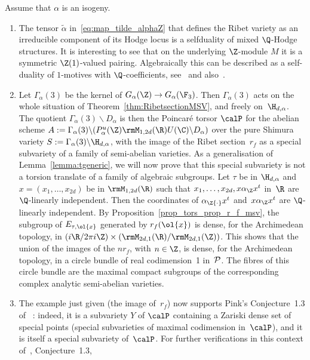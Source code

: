 \begin{Remark}\label{rem_r_f_msv}
Assume that $\alpha$ is an isogeny.
\begin{enumerate}
\item The tensor $\widetilde{\alpha}$ in~\eqref{eq:map_tilde_alphaZ}
that defines the Ribet variety as an irreducible component of its
Hodge locus is a selfduality of mixed $\Q$-Hodge structures. It is
interesting to see that on the underlying $\Z$-module $M$ it is a
symmetric $\Z(1)$-valued pairing. Algebraically this can be
described as a self-duality of $1$-motives with $\Q$-coefficients,
see~\cite{Ribet} and also~\cite{Bertrand13a}.
\item\label{rem_r_f_msv_item_2} Let $\Gamma_\alpha(3)$ be the kernel
of $G_\alpha(\Z)\to G_\alpha(\F_3)$. Then $\Gamma_\alpha(3)$ acts on
the whole situation of Theorem~\ref{thm:RibetsectionMSV}, and freely
on~$\H_{d,\alpha}$. The quotient $\Gamma_\alpha(3) \backslash
D_\alpha$ is then the Poincaré torsor $\calP$ for the abelian
scheme $A:=\Gamma_\alpha(3)\backslash
(P_\alpha^u(\Z)\rmM_{1,2d}(\R)U(\C)\backslash D_\alpha)$ over the
pure Shimura variety $S:=\Gamma_{\alpha}(3)\backslash
\H_{d,\alpha}$, with the image of the Ribet section~$r_f$ as a
special subvariety of a family of semi-abelian varieties. As a
generalisation of Lemma~\ref{lemma:tgeneric}, we will now prove that
this special subvariety is not a torsion translate of a family of
algebraic subgroups. Let $\tau$ be in $\H_{d,\alpha}$ and
$x=(x_1,\ldots,x_{2d})$ be in $\rmM_{1,2d}(\R)$ such that
$x_1,\ldots,x_{2d}, x\alpha_\Z x^t$ in~$\R$ are $\Q$-linearly
independent. Then the coordinates of $\alpha_\Z{\cdot}x^t$ and~$x\alpha_\Z x^t$ are $\Q$-linearly independent. By
Proposition~\ref{prop_tors_prop_r_f_msv}, the subgroup of
$E_{\tau,\ol{x}}$ generated by $r_f(\ol{x})$ is dense, for the
Archimedean topology, in $(i\R/2\pi
i\Z)\times(\rmM_{2d,1}(\R)/\rmM_{2d,1}(\Z))$. This shows that the
union of the images of the $nr_f$, with $n\in\nobreak\Z$, is dense, for the
Archimedean topology, in a circle bundle of real codimension~1
in~$\cal{P}$. The fibres of this circle bundle are the maximal
compact subgroups of the corresponding complex analytic semi-abelian
varieties.
\item The example just given (the image of~$r_f$) now supports Pink's
Conjecture~1.3 of ~\cite{Pink2}: indeed, it is a subvariety $Y$ of
$\calP$ containing a Zariski dense set of special points
(\ie special subvarieties of maximal codimension in~$\calP$), and
it is itself a special subvariety of~$\calP$. For further
verifications in this context of~\cite{Pink2}, Conjecture~1.3,

\end{enumerate}
\end{Remark}
